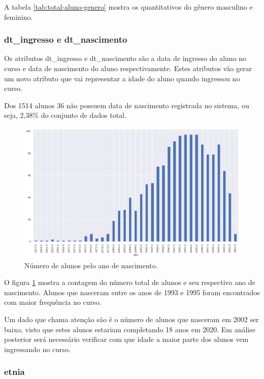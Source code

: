 \documentclass[diss,capa]{texufpel}
\begin{document}
A tabela \ref{tab:total-aluno-genero} mostra os quantitativos do gênero masculino e feminino. 

\subsubsection{dt\_ingresso e dt\_nascimento}

Os atributos dt\_ingresso e dt\_nascimento são a data de ingresso do aluno no curso e data de nascimento do aluno respectivamente. Estes atributos vão gerar um novo atributo que vai representar a idade do aluno quando ingressou no curso.

Dos 1514 alunos 36 não possuem data de nascimento registrada no sistema, ou seja, 2,38\% do conjunto de dados total.

\begin{figure}[htbp]
\centering \includegraphics[scale=.48]{imagens/ano-de-nascimento.png}
\caption{Número de alunos pelo ano de nascimento.}
\label{fig:nr-alunos-pelo-ano-nascimento}
\end{figure}

O figura \ref{fig:nr-alunos-pelo-ano-nascimento} mostra a contagem do número total de alunos e seu respectivo ano de nascimento. Alunos que nasceram entre os anos de 1993 e 1995 foram encontrados com maior frequência no curso.

Um dado que chama atenção são é o número de alunos que nasceram em 2002 ser baixo, visto que estes alunos estariam completando 18 anos em 2020. Em análise posterior será necessário verificar com que idade a maior parte dos alunos vem ingressando no curso.

\subsubsection{etnia}
\end{document}

